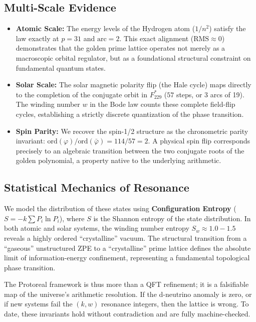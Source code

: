 \subsection{Multi-Scale Evidence}\label{sec:evidence}
\begin{itemize}
    \item \textbf{Atomic Scale:} The energy levels of the Hydrogen atom ($1/n^2$) satisfy the law exactly at $p=31$ and $\text{arc}=2$. This exact alignment ($\text{RMS} \approx 0$) demonstrates that the golden prime lattice operates not merely as a macroscopic orbital regulator, but as a foundational structural constraint on fundamental quantum states.
    \item \textbf{Solar Scale:} The solar magnetic polarity flip (the Hale cycle) maps directly to the completion of the conjugate orbit in $F_{229}^*$ ($57$ steps, or 3 arcs of 19). The winding number $w$ in the Bode law counts these complete field-flip cycles, establishing a strictly discrete quantization of the phase transition.
    \item \textbf{Spin Parity:} We recover the spin-1/2 structure as the chronometric parity invariant: $\text{ord}(\varphi)/\text{ord}(\bar{\varphi}) = 114/57 = 2$. A physical spin flip corresponds precisely to an algebraic transition between the two conjugate roots of the golden polynomial, a property native to the underlying arithmetic.
\end{itemize}

\subsection{Statistical Mechanics of Resonance}\label{sec:statmech}
We model the distribution of these states using \textbf{Configuration Entropy} ($S = -k \sum P_i \ln P_i$), where $S$ is the Shannon entropy of the state distribution. In both atomic and solar systems, the winding number entropy $S_w \approx 1.0-1.5$ reveals a highly ordered ``crystalline'' vacuum. The structural transition from a ``gaseous'' unstructured ZPE to a ``crystalline'' prime lattice defines the absolute limit of information-energy confinement, representing a fundamental topological phase transition.

The Protoreal framework is thus more than a QFT refinement; it is a falsifiable map of the universe's arithmetic resolution. If the d-neutrino anomaly is zero, or if new systems fail the $(k, w)$ resonance integers, then the lattice is wrong. To date, these invariants hold without contradiction and are fully machine-checked.

